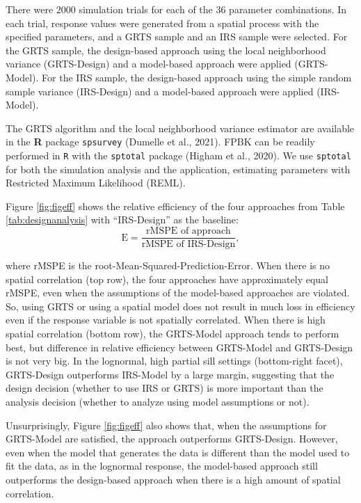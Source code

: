 \documentclass[]{elsarticle} %
\begin{document}
There were 2000 simulation trials for each of the 36 parameter
combinations. In each trial, response values were generated from a
spatial process with the specified parameters, and a GRTS sample and an
IRS sample were selected. For the GRTS sample, the design-based approach
using the local neighborhood variance (GRTS-Design) and a model-based
approach were applied (GRTS-Model). For the IRS sample, the design-based
approach using the simple random sample variance (IRS-Design) and a
model-based approach were applied (IRS-Model).

The GRTS algorithm and the local neighborhood variance estimator are
available in the \textbf{\textsf{R}} package \texttt{spsurvey} (Dumelle
et al., 2021). FPBK can be readily performed in \texttt{R} with the
\texttt{sptotal} package (Higham et al., 2020). We use \texttt{sptotal}
for both the simulation analysis and the application, estimating
parameters with Restricted Maximum Likelihood (REML).

Figure \ref{fig:figeff} shows the relative efficiency of the four
approaches from Table \ref{tab:designanalysis} with ``IRS-Design'' as
the baseline: \mbox{} \begin{equation*}
\text{E} = \frac{\text{rMSPE of approach}}{\text{rMSPE of IRS-Design}},
\end{equation*}

where rMSPE is the root-Mean-Squared-Prediction-Error. When there is no
spatial correlation (top row), the four approaches have approximately
equal rMSPE, even when the assumptions of the model-based approaches are
violated. So, using GRTS or using a spatial model does not result in
much loss in efficiency even if the response variable is not spatially
correlated. When there is high spatial correlation (bottom row), the
GRTS-Model approach tends to perform best, but difference in relative
efficiency between GRTS-Model and GRTS-Design is not very big. In the
lognormal, high partial sill settings (bottom-right facet), GRTS-Design
outperforms IRS-Model by a large margin, suggesting that the design
decision (whether to use IRS or GRTS) is more important than the
analysis decision (whether to analyze using model assumptions or not).

Unsurprisingly, Figure \ref{fig:figeff} also shows that, when the
assumptions for GRTS-Model are satisfied, the approach outperforms
GRTS-Design. However, even when the model that generates the data is
different than the model used to fit the data, as in the lognormal
response, the model-based approach still outperforms the design-based
approach when there is a high amount of spatial correlation.
\end{document}
